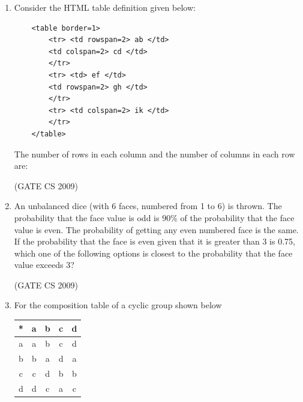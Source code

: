 \documentclass[a4paper, 11pt]{article}
\begin{document}
\begin{enumerate}
    \item Consider the HTML table definition given below:
    \begin{lstlisting}
    <table border=1>
        <tr> <td rowspan=2> ab </td>
        <td colspan=2> cd </td>
        </tr>
        <tr> <td> ef </td>
        <td rowspan=2> gh </td>
        </tr>
        <tr> <td colspan=2> ik </td>
        </tr>
    </table>
    \end{lstlisting}
    The number of rows in each column and the number of columns in each row are: 
    \begin{enumerate}
    \end{enumerate}

    \hfill (GATE CS 2009)

    \item An unbalanced dice (with 6 faces, numbered from 1 to 6) is thrown. The probability that the face value is odd is $90\%$ of the probability that the face value is even. The probability of getting any even numbered face is the same.\\
    If the probability that the face is even given that it is greater than 3 is 0.75, which one of the following options is closest to the probability that the face value exceeds 3?
    \begin{enumerate}
    \end{enumerate}


    \hfill (GATE CS 2009)

    \item  For the composition table of a cyclic group shown below\\
    \begin{tabular}{c|cccc}
        * &a &b &c &d \\
        \hline
        a &a &b &c &d \\
        b &b &a &d &a \\
        c &c &d &b &b \\
        d &d &c &a &c \\
        

\end{tabular}
\end{enumerate}
\end{document}
